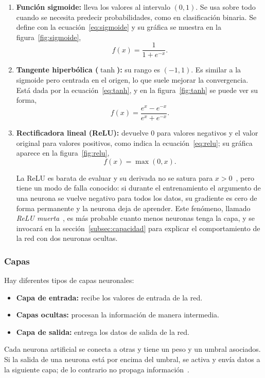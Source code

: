 \documentclass[titlepage,11pt]{article}
\begin{document}
\begin{enumerate}
\item \textbf{Función sigmoide:} lleva los valores al intervalo $(0,1)$. Se usa
  sobre todo cuando se necesita predecir probabilidades, como en clasificación
  binaria. Se define con la ecuación~\eqref{eq:sigmoide} y su gráfica se
  muestra en la figura~\ref{fig:sigmoide},
  \begin{equation}
    f(x)=\frac{1}{1+e^{-x}}.
    \label{eq:sigmoide}
  \end{equation}

\item \textbf{Tangente hiperbólica ($\tanh$):} su rango es $(-1,1)$. Es similar
  a la sigmoide pero centrada en el origen, lo que suele mejorar la
  convergencia. Está dada por la ecuación~\eqref{eq:tanh}, y en la
  figura~\ref{fig:tanh} se puede ver su forma,
  \begin{equation}
    f(x)=\frac{e^{x}-e^{-x}}{e^{x}+e^{-x}}.
    \label{eq:tanh}
  \end{equation}

\item \textbf{Rectificadora lineal (ReLU):} devuelve 0 para valores negativos y
  el valor original para valores positivos, como indica la
  ecuación~\eqref{eq:relu}; su gráfica aparece en la figura~\ref{fig:relu},
  \begin{equation}
    f(x)=\max(0,x).
    \label{eq:relu}
  \end{equation}

  La ReLU es barata de evaluar y su derivada no se satura para
  $x>0$~\cite{goodfellow_2016_deep}, pero
  tiene un modo de falla conocido: si durante el entrenamiento el argumento de
  una neurona se vuelve negativo para todos los datos, su gradiente es cero de
  forma permanente y la neurona deja de aprender. Este fenómeno, llamado
  \emph{ReLU muerta}~\cite{lu_2020_dying}, es más probable cuanto menos neuronas tenga la capa, y se
  invocará en la sección~\ref{subsec:capacidad} para explicar el
  comportamiento de la red con dos neuronas ocultas.
\end{enumerate}

\subsubsection{Capas}
Hay diferentes tipos de capas neuronales:
\begin{itemize}
\item \textbf{Capa de entrada:} recibe los valores de entrada de la red.
\item \textbf{Capas ocultas:} procesan la información de manera intermedia.
\item \textbf{Capa de salida:} entrega los datos de salida de la red.
\end{itemize}
Cada neurona artificial se conecta a otras y tiene un peso y un umbral
asociados. Si la salida de una neurona está por encima del umbral, se activa y
envía datos a la siguiente capa; de lo contrario no propaga
información~\cite{antonio_2023_introduccin,ibm_qu}.
\end{document}
